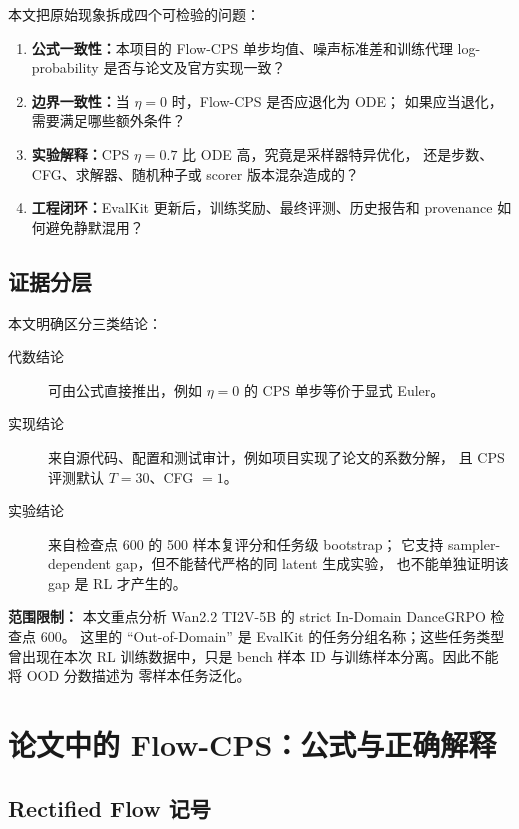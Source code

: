 \documentclass[11pt,a4paper]{article}
\newcommand{\warnbox}[1]{%
  \noindent\colorbox{WanLightOrange}{%
    \parbox{\dimexpr\textwidth-2\fboxsep\relax}{\textcolor{WanOrange}{#1}}%
  }%
}
\begin{document}
本文把原始现象拆成四个可检验的问题：

\begin{enumerate}
  \item \textbf{公式一致性：}本项目的 Flow-CPS 单步均值、噪声标准差和训练代理
  log-probability 是否与论文及官方实现一致？
  \item \textbf{边界一致性：}当 $\eta=0$ 时，Flow-CPS 是否应退化为 ODE；
  如果应当退化，需要满足哪些额外条件？
  \item \textbf{实验解释：}CPS $\eta=0.7$ 比 ODE 高，究竟是采样器特异优化，
  还是步数、CFG、求解器、随机种子或 scorer 版本混杂造成的？
  \item \textbf{工程闭环：}EvalKit 更新后，训练奖励、最终评测、历史报告和
  provenance 如何避免静默混用？
\end{enumerate}

\subsection{证据分层}

本文明确区分三类结论：

\begin{description}
  \item[代数结论] 可由公式直接推出，例如 $\eta=0$ 的 CPS 单步等价于显式 Euler。
  \item[实现结论] 来自源代码、配置和测试审计，例如项目实现了论文的系数分解，
  且 CPS 评测默认 $T=30$、CFG $=1$。
  \item[实验结论] 来自检查点 600 的 500 样本复评分和任务级 bootstrap；
  它支持 sampler-dependent gap，但不能替代严格的同 latent 生成实验，
  也不能单独证明该 gap 是 RL 才产生的。
\end{description}

\warnbox{\textbf{范围限制：}
本文重点分析 Wan2.2 TI2V-5B 的 strict In-Domain DanceGRPO 检查点 600。
这里的 ``Out-of-Domain'' 是 EvalKit 的任务分组名称；这些任务类型曾出现在本次
RL 训练数据中，只是 bench 样本 ID 与训练样本分离。因此不能将 OOD 分数描述为
零样本任务泛化。}

\section{论文中的 Flow-CPS：公式与正确解释}

\subsection{Rectified Flow 记号}
\end{document}
